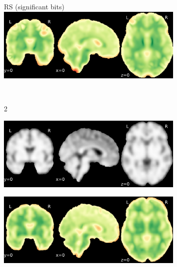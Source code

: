 \documentclass{article}
\begin{document}
\begin{appendices}
\begin{landscape}
\begin{figure}
\begin{subfigure}[t]{0.2\paperheight}
            \end{subfigure}
            \begin{subfigure}[t]{0.2\paperheight}
                \centering
                RS (significant bits)
                \includegraphics[width=\textwidth]{figures/sig/10mm/rs_ds001600_sub-1_sig.pdf}
            \end{subfigure} \\
            \begin{subfigure}[b][][c]{0.01\paperwidth} 2 \vspace*{15pt} \end{subfigure}
            \begin{subfigure}[t]{0.2\paperheight}
                \centering
                \includegraphics[width=\textwidth]{figures/sig/10mm/ieee_ds001771_sub-36.pdf}
            \end{subfigure}
            \begin{subfigure}[t]{0.2\paperheight}
                \centering
                \includegraphics[width=\textwidth]{figures/sig/10mm/rr_ds001771_sub-36_sig.pdf}

\end{subfigure}
\end{figure}
\end{landscape}
\end{appendices}
\end{document}
